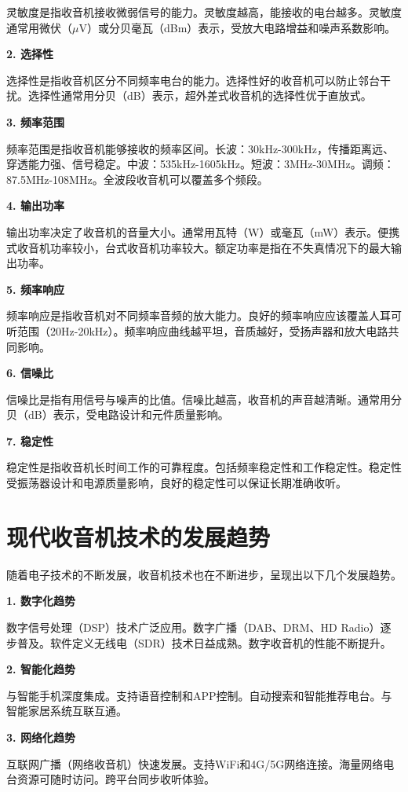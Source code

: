 \documentclass[12pt,UTF8]{ctexbook}
\begin{document}
灵敏度是指收音机接收微弱信号的能力。灵敏度越高，能接收的电台越多。灵敏度通常用微伏（$\mu$V）或分贝毫瓦（dBm）表示，受放大电路增益和噪声系数影响。

\textbf{2. 选择性}

选择性是指收音机区分不同频率电台的能力。选择性好的收音机可以防止邻台干扰。选择性通常用分贝（dB）表示，超外差式收音机的选择性优于直放式。

\textbf{3. 频率范围}

频率范围是指收音机能够接收的频率区间。长波：30kHz-300kHz，传播距离远、穿透能力强、信号稳定。中波：535kHz-1605kHz。短波：3MHz-30MHz。调频：87.5MHz-108MHz。全波段收音机可以覆盖多个频段。

\textbf{4. 输出功率}

输出功率决定了收音机的音量大小。通常用瓦特（W）或毫瓦（mW）表示。便携式收音机功率较小，台式收音机功率较大。额定功率是指在不失真情况下的最大输出功率。

\textbf{5. 频率响应}

频率响应是指收音机对不同频率音频的放大能力。良好的频率响应应该覆盖人耳可听范围（20Hz-20kHz）。频率响应曲线越平坦，音质越好，受扬声器和放大电路共同影响。

\textbf{6. 信噪比}

信噪比是指有用信号与噪声的比值。信噪比越高，收音机的声音越清晰。通常用分贝（dB）表示，受电路设计和元件质量影响。

\textbf{7. 稳定性}

稳定性是指收音机长时间工作的可靠程度。包括频率稳定性和工作稳定性。稳定性受振荡器设计和电源质量影响，良好的稳定性可以保证长期准确收听。

\section{现代收音机技术的发展趋势}

随着电子技术的不断发展，收音机技术也在不断进步，呈现出以下几个发展趋势。

\textbf{1. 数字化趋势}

数字信号处理（DSP）技术广泛应用。数字广播（DAB、DRM、HD Radio）逐步普及。软件定义无线电（SDR）技术日益成熟。数字收音机的性能不断提升。

\textbf{2. 智能化趋势}

与智能手机深度集成。支持语音控制和APP控制。自动搜索和智能推荐电台。与智能家居系统互联互通。

\textbf{3. 网络化趋势}

互联网广播（网络收音机）快速发展。支持WiFi和4G/5G网络连接。海量网络电台资源可随时访问。跨平台同步收听体验。
\end{document}
